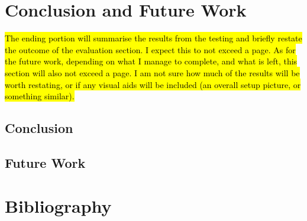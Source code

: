 \documentclass[12pt,a4paper]{report}
\begin{document}
\chapter{Conclusion and Future Work}
\hl{The ending portion will summarise the results from the testing and briefly restate the outcome of the evaluation section. I expect this to not exceed a page. As for the future work, depending on what I manage to complete, and what is left, this section will also not exceed a page. I am not sure how much of the results will be worth restating, or if any visual aids will be included (an overall setup picture, or something similar).}

\section{Conclusion}
\section{Future Work}

\newpage
\chapter{Bibliography}
\begingroup
   \def\chapter*#1{}


\endgroup
\end{document}
